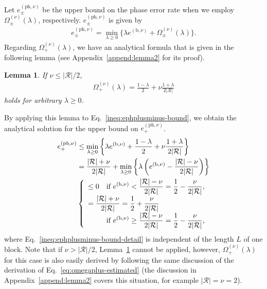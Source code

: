 \documentclass[twocolumn,superscriptaddress,pra,footinbib,notitlepage]{revtex4-1}
\newcommand{\1}{\mbox{1}\hspace{-0.25em}\mbox{l}}
\newcommand{\abs}[1]{\lvert#1\rvert}
\newtheorem{lem}{Lemma}
\begin{document}
Let $e_\pm^{(\textrm{ph}, \nu)}$ be the upper bound on the phase error rate when we employ $\Omega_\pm^{(\nu)}(\lambda)$, respectively. $e_\pm^{(\textrm{ph}, \nu)}$ is given by
\begin{align}
e_\pm^{(\textrm{ph}, \nu)}=\min_{\lambda\geq0}\{\lambda e^{(\textrm{b}, \nu)}+\Omega_\pm^{(\nu)}(\lambda)\}.\label{ineq:ephplusminus-bound}
\end{align}
Regarding $\Omega_+^{(\nu)}(\lambda)$, we have an analytical formula that is given in the following lemma (see Appendix~\ref{append:lemma2} for its proof).
\begin{lem}
If $\nu\leq\abs{\mathcal{R}}/2$,
\begin{align}
\Omega_+^{(\nu)}(\lambda)=\frac{1-\lambda}{2}+\nu\frac{1+\lambda}{2\abs{\mathcal{R}}}\label{eq:omegaplus-estimated}
\end{align}
holds for arbitrary $\lambda\geq0$.
\label{lem:omegaplus-estimated}
\end{lem}
By applying this lemma to Eq.~\eqref{ineq:ephplusminus-bound}, we obtain the analytical solution for the upper bound on $e^{(\textrm{ph},\nu)}_+$.
\begin{align}
e_+^{(\textrm{ph}, \nu)}&\leq\min_{\lambda\geq0}\left\{\lambda e^{(\textrm{b}, \nu)}+\frac{1-\lambda}{2}+\nu\frac{1+\lambda}{2\abs{\mathcal{R}}}\right\}\nonumber\\
&=\frac{\abs{\mathcal{R}}+\nu}{2\abs{\mathcal{R}}}+\min_{\lambda\geq0}\left\{\lambda \left(e^{(\textrm{b}, \nu)}-\frac{\abs{\mathcal{R}}-\nu}{2\abs{\mathcal{R}}}\right)\right\}\nonumber\\
&\left\{
\begin{array}{l}
\leq0\quad\displaystyle\hfill\textrm{if }e^{(\textrm{b}, \nu)}<\frac{\abs{\mathcal{R}}-\nu}{2\abs{\mathcal{R}}}=\frac{1}{2}-\frac{\nu}{2\abs{\mathcal{R}}},\\
=\displaystyle\frac{\abs{\mathcal{R}}+\nu}{2\abs{\mathcal{R}}}=\frac{1}{2}+\frac{\nu}{2\abs{\mathcal{R}}}\\
\displaystyle\hfill\textrm{if }e^{(\textrm{b}, \nu)}\geq\frac{\abs{\mathcal{R}}-\nu}{2\abs{\mathcal{R}}}=\frac{1}{2}-\frac{\nu}{2\abs{\mathcal{R}}},
\end{array}
\right.\nonumber\\
\label{ineq:ephplusminus-bound-detail}
\end{align}
where Eq.~\eqref{ineq:ephplusminus-bound-detail} is independent of the length $L$ of one block.
Note that if $\nu>\abs{\mathcal{R}}/2$, Lemma~\ref{lem:omegaplus-estimated} cannot be applied, however, $\Omega_+^{(\nu)}(\lambda)$ for this case is also easily derived by following the same discussion of the derivation of Eq.~\eqref{eq:omegaplus-estimated} (the discussion in Appendix~\ref{append:lemma2} covers this situation, for example $\abs{\mathcal{R}}=\nu=2$).
\end{document}
